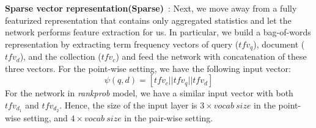 \documentclass[sigconf]{acmart}
\newcommand{\modelthree}{\textit{rank\-prob} model\xspace}
\newcommand{\Feedtwo}{Sparse vector representation\xspace}
\newcommand{\ftwo}{Sparse\xspace}
\newcommand{\mypar}[1]{\vspace*{-0.1ex}\medskip\noindent\textbf{#1}~}
\begin{document}
\mypar{\Feedtwo (\ftwo)}: 
Next, we move away from a fully featurized representation that contains only aggregated statistics and let the network performs feature extraction for us. In particular, we build a bag-of-words representation by extracting term frequency vectors of query ($tfv_q$), document ($tfv_d$), and the collection ($tfv_c$) and feed the network with concatenation of these three vectors. For the point-wise setting, we have the following input vector:
\begin{equation}
\psi(q, d) = [tfv_c || tfv_q || tfv_d]
\end{equation}
For the network in \modelthree, we have a similar input vector with both $tfv_{d_1}$ and $tfv_{d_2}$. Hence, the size of the input layer is $3 \times vocab~size$ in the point-wise setting, and $4 \times vocab~size$ in the pair-wise setting. 
\end{document}
